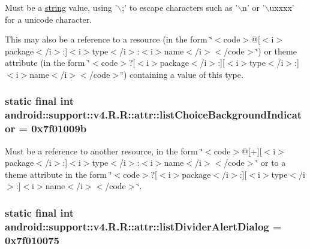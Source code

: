 Must be a \hyperlink{classandroid_1_1support_1_1v4_1_1_r_1_1string}{string} value, using '$\backslash$;' to escape characters such as '$\backslash$n' or '$\backslash$uxxxx' for a unicode character. 

This may also be a reference to a resource (in the form \char`\"{}$<$code$>$@\mbox{[}$<$i$>$package$<$/i$>$:\mbox{]}$<$i$>$type$<$/i$>$:$<$i$>$name$<$/i$>$$<$/code$>$\char`\"{}) or theme attribute (in the form \char`\"{}$<$code$>$?\mbox{[}$<$i$>$package$<$/i$>$:\mbox{]}\mbox{[}$<$i$>$type$<$/i$>$:\mbox{]}$<$i$>$name$<$/i$>$$<$/code$>$\char`\"{}) containing a value of this type. \hypertarget{classandroid_1_1support_1_1v4_1_1_r_1_1attr_54309dc033c5bb775be6982449c69c5a}{
\subsubsection[{listChoiceBackgroundIndicator}]{\setlength{\rightskip}{0pt plus 5cm}static final int android::support::v4.R.R::attr::listChoiceBackgroundIndicator = 0x7f01009b}}
\label{classandroid_1_1support_1_1v4_1_1_r_1_1attr_54309dc033c5bb775be6982449c69c5a}


Must be a reference to another resource, in the form \char`\"{}$<$code$>$@\mbox{[}+\mbox{]}\mbox{[}$<$i$>$package$<$/i$>$:\mbox{]}$<$i$>$type$<$/i$>$:$<$i$>$name$<$/i$>$$<$/code$>$\char`\"{} or to a theme attribute in the form \char`\"{}$<$code$>$?\mbox{[}$<$i$>$package$<$/i$>$:\mbox{]}\mbox{[}$<$i$>$type$<$/i$>$:\mbox{]}$<$i$>$name$<$/i$>$$<$/code$>$\char`\"{}. \hypertarget{classandroid_1_1support_1_1v4_1_1_r_1_1attr_7ad1723d1c14fd74cd90b447f3513b5c}{
\subsubsection[{listDividerAlertDialog}]{\setlength{\rightskip}{0pt plus 5cm}static final int android::support::v4.R.R::attr::listDividerAlertDialog = 0x7f010075}}
\label{classandroid_1_1support_1_1v4_1_1_r_1_1attr_7ad1723d1c14fd74cd90b447f3513b5c}


